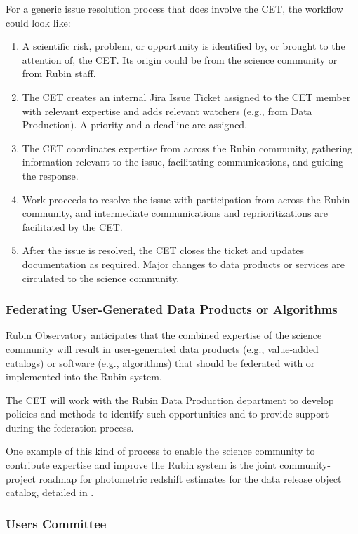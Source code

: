 \documentclass[DM,lsstdraft,toc]{lsstdoc}
\begin{document}
For a generic issue resolution process that does involve the CET, the workflow could look like:
\begin{enumerate}
\item A scientific risk, problem, or opportunity is identified by, or brought to the attention of, the CET. Its origin could be from the science community or from Rubin staff.
\item The CET creates an internal Jira Issue Ticket assigned to the CET member with relevant expertise and adds relevant watchers (e.g., from Data Production). A priority and a deadline are assigned. 
\item The CET coordinates expertise from across the Rubin community, gathering information relevant to the issue, facilitating communications, and guiding the response.
\item Work proceeds to resolve the issue with participation from across the Rubin community, and intermediate communications and reprioritizations are facilitated by the CET.
\item After the issue is resolved, the CET closes the ticket and updates documentation as required. Major changes to data products or services are circulated to the science community.
\end{enumerate}


\subsubsection{Federating User-Generated Data Products or Algorithms}\label{sssec:mod_coord_ug}

Rubin Observatory anticipates that the combined expertise of the science community will result in user-generated data products (e.g., value-added catalogs) or software (e.g., algorithms) that should be federated with or implemented into the Rubin system.

The CET will work with the Rubin Data Production department to develop policies and methods to identify such opportunities and to provide support during the federation process.

One example of this kind of process to enable the science community to contribute expertise and improve the Rubin system is the joint community-project roadmap for photometric redshift estimates for the data release object catalog, detailed in .


\subsubsection{Users Committee}\label{sssec:mod_coord_uc}
\end{document}

